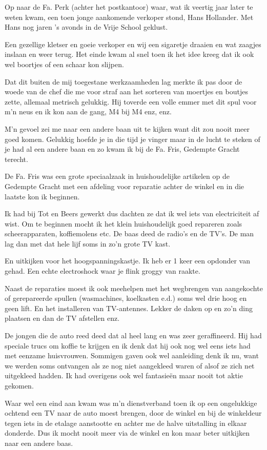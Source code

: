 \documentclass[10pt,twoside,openright]{memoir}
\begin{document}
Op naar de Fa. Perk (achter het postkantoor) waar, wat ik veertig jaar later te weten kwam, een toen jonge aankomende verkoper stond, Hans Hollander. Met Hans nog jaren ’s avonds in de Vrije School geklust. 

Een gezellige kletser en goeie verkoper en wij een sigaretje draaien en wat zaagjes inslaan en weer terug. Het einde kwam al snel toen ik het idee kreeg dat ik ook wel boortjes of een schaar kon slijpen. 

Dat dit buiten de mij toegestane werkzaamheden lag merkte ik pas door de woede van de chef die me voor straf aan het sorteren van moertjes en boutjes zette, allemaal metrisch gelukkig. Hij toverde een volle emmer met dit spul voor m’n neus en ik kon aan de gang, M4 bij M4 enz, enz. 

M’n gevoel zei me naar een andere baan uit te kijken want dit zou nooit meer goed komen. Gelukkig hoefde je in die tijd je vinger maar in de lucht te steken of je had al een andere baan en zo kwam ik bij de Fa. Fris, Gedempte Gracht terecht.

De Fa. Fris was een grote speciaalzaak in huishoudelijke artikelen op de Gedempte Gracht met een afdeling voor reparatie achter de winkel en in die laatste kon ik beginnen. 

Ik had bij Tot en Beers gewerkt dus dachten ze dat ik wel iets van electriciteit af wist. Om te beginnen mocht ik het klein huishoudelijk goed repareren zoals scheerapparaten, koffiemolens etc. De baas deed de radio’s en de TV’s. De man lag dan met dat hele lijf soms in zo’n grote TV kast. 

En uitkijken voor het hoogspanningskastje. Ik heb er 1 keer een opdonder van gehad. Een echte electroshock waar je flink groggy van raakte.

Naast de reparaties moest ik ook meehelpen met het wegbrengen van aangekochte of gerepareerde spullen (wasmachines, koelkasten e.d.) soms wel drie hoog en geen lift. En het installeren van TV-antennes. Lekker de daken op en zo’n ding plaatsen en dan de TV afstellen enz. 

De jongen die de auto reed deed dat al heel lang en was zeer geraffineerd. Hij had speciale trucs om koffie te krijgen en ik denk dat hij ook nog wel eens iets had met eenzame huisvrouwen. Sommigen gaven ook wel aanleiding denk ik nu, want we werden soms ontvangen als ze nog niet aangekleed waren of alsof ze zich net uitgekleed hadden. Ik had overigens ook wel fantasieën maar nooit tot aktie gekomen. 

Waar wel een eind aan kwam was m’n dienstverband toen ik op een ongelukkige ochtend een TV naar de auto moest brengen, door de winkel en bij de winkeldeur tegen iets in de etalage aanstootte en achter me de halve uitstalling in elkaar donderde. Dus ik mocht nooit meer via de winkel en kon maar beter uitkijken naar een andere baas.
\end{document}
